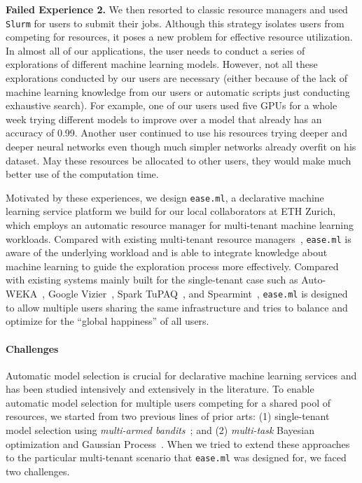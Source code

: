 \documentclass[letterpaper]{vldb}
\newcommand{\eml}{\texttt{ease.ml}\xspace}
\begin{document}
\vspace{0.3em}
\noindent
{\bf Failed Experience 2.} We then resorted to classic resource
managers and used \texttt{Slurm} for users to submit 
their jobs. 
Although this strategy isolates
users from competing for resources, it poses a
new problem for effective resource utilization.
In almost all of our applications, the user needs to conduct 
a series of explorations of different machine learning
models.
However, not all these explorations conducted by
our users are necessary (either because of the lack
of machine learning knowledge from our users or automatic 
scripts just conducting exhaustive search). For example,
one of our users used five GPUs for a whole week
trying different models to improve
over a model that already has an accuracy of 0.99.
Another user 
continued to use his resources trying deeper and 
deeper neural networks even though much simpler
networks already overfit on his dataset.
May these resources be allocated to other users,
they would make much better use of the computation time.

\vspace{0.3em}
Motivated by these experiences, we design
\eml, a declarative machine learning service platform we build for our local collaborators at ETH Zurich,
which employs an automatic resource manager for multi-tenant machine learning workloads.
Compared with existing multi-tenant 
resource managers~\cite{XXX,XXX,XXX,XXX,XXX,XXX,XXX,XXX}, \eml
is aware of the underlying workload and is able to
integrate knowledge about machine learning
to guide the exploration process more effectively.
Compared with existing systems mainly built for the
single-tenant case
such as Auto-WEKA~\cite{XXX}, 
Google Vizier~\cite{XXX}, Spark TuPAQ~\cite{XXX}, and Spearmint~\cite{XXX}, \eml is 
designed to allow multiple users sharing the same
infrastructure and tries to balance and optimize for
the ``global happiness'' of all users.

\vspace{-0.5em}
\paragraph*{Challenges}

Automatic model selection is crucial for declarative machine learning services 
and has been studied intensively and extensively in the literature.
To enable automatic model selection for multiple users
competing for a shared pool of resources,
we started from two previous lines of prior arts:
(1) single-tenant model selection using 
\emph{multi-armed bandits}~\cite{XXX,XXX,XXX};
and (2) {\em multi-task} Bayesian optimization
and Gaussian Process~\cite{XXX,XXX,XXX}.
When we tried to extend these approaches to the particular multi-tenant scenario that \eml was designed for,
we faced two challenges.
\end{document}
